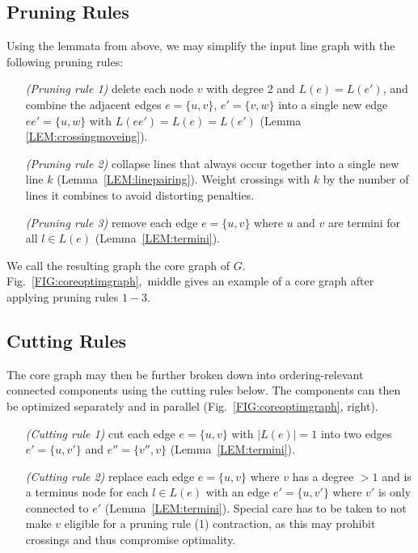 \documentclass[sigconf]{acmart}
\begin{document}
\subsection{Pruning Rules}\label{SEC:pruning}

Using the lemmata from above, we may simplify the input line graph with the following pruning rules:
\begin{enumerate}[parsep=0.5mm, wide, labelwidth=0mm, itemindent=2.3mm]
	\setlength\itemsep{1pt}
	\item[\emph{(Pruning rule 1)}] delete each node $v$ with degree 2 and $L(e) = L(e')$, and combine the adjacent edges $e = \{u, v\}$, $e' = \{v, w\}$ into a single new edge $ee' = \{u, w\}$ with $L(ee') = L(e) = L(e')$ (Lemma \ref{LEM:crossingmoveing}).
	\item[\emph{(Pruning rule 2)}] collapse lines that always occur together into a single new line $k$ (Lemma~\ref{LEM:linepairing}). Weight crossings with $k$ by the number of lines it combines to avoid distorting penalties.
	\item[\emph{(Pruning rule 3)}] remove each edge $e = \{u, v\}$ where $u$ and $v$ are termini for all $l \in L(e)$ (Lemma~\ref{LEM:termini}).
\end{enumerate}
\noindent

We call the resulting graph the core graph of $G$. Fig.~\ref{FIG:coreoptimgraph},~middle gives an example of a core graph after applying pruning rules $1-3$.

\subsection{Cutting Rules}

The core graph may then be further broken down into ordering-relevant connected components using the cutting rules below. The components can then be optimized separately and in parallel (Fig.~\ref{FIG:coreoptimgraph}, right).
\begin{enumerate}[parsep=0.5mm, wide, labelwidth=0mm, itemindent=2.3mm]
	\setlength\itemsep{1pt}
    \item[\emph{(Cutting rule 1)}] cut each edge $e = \{u, v\}$ with $\left|L\left(e\right)\right| = 1$ into two edges $e' = \{u, v'\}$ and $e'' = \{v'', v\}$ (Lemma~\ref{LEM:termini}).
    \item[\emph{(Cutting rule 2)}] replace each edge $e = \{u, v\}$ where $v$ has a degree $>1$ and is a terminus node for each $l \in L(e)$ with an edge $e' = \{u, v'\}$ where $v'$ is only connected to $e'$ (Lemma~\ref{LEM:termini}). Special care has to be taken to not make $v$ eligible for a pruning rule (1) contraction, as this may prohibit crossings and thus compromise optimality.
\end{enumerate}
\end{document}
